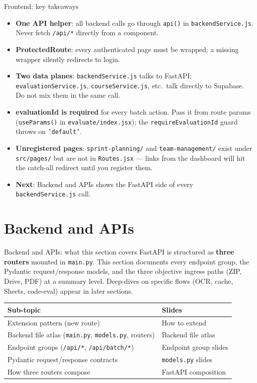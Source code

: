 \documentclass[aspectratio=169]{beamer}
\begin{document}
\begin{frame}{Frontend: key takeaways}
  \small
  \begin{itemize}\setlength\itemsep{0.3em}
    \item \textbf{One API helper}: all backend calls go through \texttt{api()} in \texttt{backendService.js}. Never fetch \texttt{/api/*} directly from a component.
    \item \textbf{ProtectedRoute}: every authenticated page must be wrapped; a missing wrapper silently redirects to login.
    \item \textbf{Two data planes}: \texttt{backendService.js} talks to FastAPI; \texttt{evaluationService.js}, \texttt{courseService.js}, etc.\ talk directly to Supabase. Do not mix them in the same call.
    \item \textbf{evaluationId is required} for every batch action. Pass it from route params (\texttt{useParams()} in \texttt{evaluate/index.jsx}); the \texttt{requireEvaluationId} guard throws on \texttt{'default'}.
    \item \textbf{Unregistered pages}: \texttt{sprint-planning/} and \texttt{team-management/} exist under \texttt{src/pages/} but are not in \texttt{Routes.jsx} --- links from the dashboard will hit the catch-all redirect until you register them.
    \item \textbf{Next}: Backend and APIs shows the FastAPI side of every \texttt{backendService.js} call.
  \end{itemize}
\end{frame}

\section{Backend and APIs}

\begin{frame}{Backend and APIs: what this section covers}
  \small
  FastAPI is structured as \textbf{three routers} mounted in \texttt{main.py}.
  This section documents every endpoint group, the Pydantic request/response models,
  and the three objective ingress paths (ZIP, Drive, PDF) at a summary level.
  Deep-dives on specific flows (OCR, cache, Sheets, code-eval) appear in later sections.\\[0.4em]
  \begin{tabular}{@{}ll@{}}
    \toprule
    Sub-topic & Slides \\
    \midrule
    Extension pattern (new route) & How to extend \\
    Backend file atlas (\texttt{main.py}, \texttt{models.py}, routers) & Backend file atlas \\
    Endpoint groups (\texttt{/api/*}, \texttt{/api/batch/*}) & Endpoint group slides \\
    Pydantic request/response contracts & \texttt{models.py} slides \\
    How three routers compose & FastAPI composition \\
    \bottomrule
  \end{tabular}
\end{frame}
\end{document}
